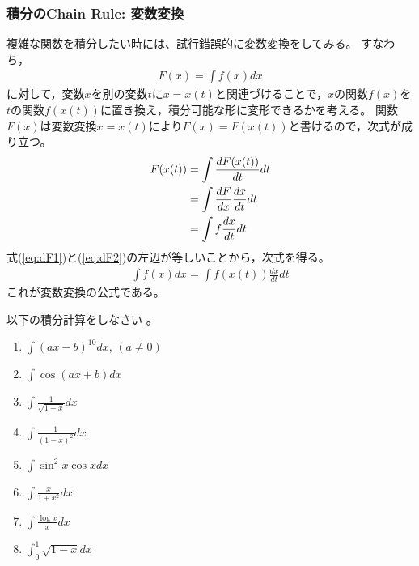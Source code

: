 \documentclass[twocolumn,11pt]{jarticle}
\begin{document}
\subsubsection{積分のChain Rule: 変数変換}
複雑な関数を積分したい時には、試行錯誤的に変数変換をしてみる。
すなわち，
\begin{align}
  F(x)=\int f(x)dx
  \label{eq:dF1}
\end{align}
に対して，変数$x$を別の変数$t$に$x=x(t)$と関連づけることで，$x$の関数$f(x)$を$t$の関数$f(x(t))$に置き換え，積分可能な形に変形できるかを考える。
関数$F(x)$は変数変換$x=x(t)$により$F(x)=F(x(t))$と書けるので，次式が成り立つ。
\begin{align}
F(x(t))&=\int\frac{dF(x(t))}{dt}dt\notag\\
	&=\int\frac{dF}{dx}\frac{dx}{dt}dt\notag\\
	&=\int f\frac{dx}{dt}dt
\label{eq:dF2}
\end{align}
式(\ref{eq:dF1})と(\ref{eq:dF2})の左辺が等しいことから，次式を得る。
\begin{align*}
  \int f(x)dx=\int f(x(t))\frac{dx}{dt}dt
\end{align*}
これが変数変換の公式である。

\exercise
以下の積分計算をしなさい
。
\begin{enumerate}
\item \label{item:ax-b}$\displaystyle\int (a x-b)^{10}dx$, $(a\ne 0)$
\item \label{item:cos(ax+b)}$\displaystyle\int \cos(ax+b) dx$
\item \label{item:1/sqrt(1-x)}$\displaystyle\int \frac{1}{\sqrt{1-x}}dx$
\item \label{item:1/(1-x)2}$\displaystyle\int \frac{1}{(1-x)^2}dx$
\item \label{item:sin2xcosx-2}$\displaystyle\int\sin^2x\cos xdx$
\item \label{item:x/(1+x2)-2}$\displaystyle\int \frac{x}{1+x^2}dx$
\item \label{item:logx/x:2}$\displaystyle\int \frac{\log x}{x}dx$
\item \label{item:sqrt(1-x)}$\displaystyle\int_0^1 \sqrt{1-x} dx$
\end{enumerate}
\end{document}
